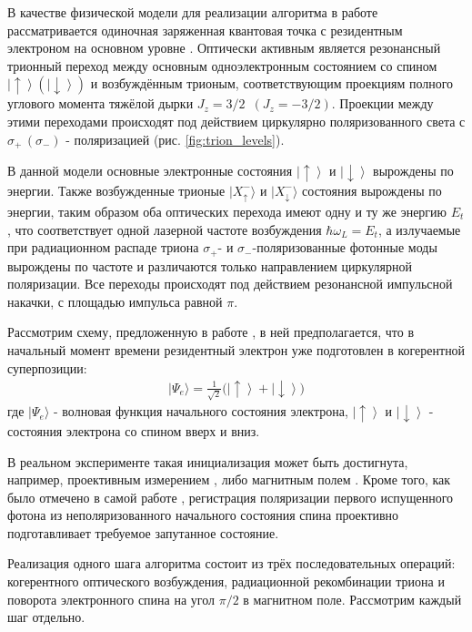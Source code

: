 \documentclass[11pt]{article}    %
\numberwithin{equation}{section}
\begin{document}
В качестве физической модели для реализации алгоритма в работе
\cite{lindner2009} рассматривается одиночная заряженная
квантовая точка с резидентным электроном на основном уровне
\cite{senellart2017}. Оптически активным является резонансный трионный
переход между основным одноэлектронным состоянием со спином
$\left|\uparrow\right\rangle (\left|\downarrow\right\rangle)$
и возбуждённым трионым, соответствующим
проекциям полного углового момента тяжёлой дырки $J_z = 3/2 \, \,\, (J_z = -3/2)$.
Проекции между этими переходами происходят под действием циркулярно поляризованного света
с $\sigma_+ \, (\sigma_-)$ - поляризацией (рис. \ref{fig:trion_levels}).

В данной модели основные электронные состояния
$\left|\uparrow\right\rangle$ и $\left|\downarrow\right\rangle$
вырождены по энергии.
Также возбужденные трионые $|X^-_{\uparrow}\rangle$ и $|X^-_{\downarrow}\rangle$
состояния вырождены по энергии, таким образом оба оптических
перехода имеют одну и ту же энергию $E_t$, что соответствует одной
лазерной частоте возбуждения $\hbar\omega_L = E_t$, а
излучаемые при радиационном распаде триона $\sigma_+$- и
$\sigma_-$-поляризованные фотонные моды вырождены по частоте и
различаются только направлением циркулярной поляризации.
Все переходы происходят под действием резонансной импульсной накачки,
с площадью импульса равной $\pi$.

Рассмотрим схему, предложенную в работе \cite{lindner2009},
в ней предполагается, что в начальный момент времени резидентный
электрон уже подготовлен в когерентной суперпозиции:
\begin{gather}
    |\Psi_e\rangle = \frac{1}{\sqrt{2}}\bigl(\left|\uparrow\right\rangle
    + \left|\downarrow\right\rangle\bigr)
    \label{eq:LR_init}
\end{gather}
где $|\Psi_e\rangle$ - волновая функция начального состояния электрона,
$\left|\uparrow\right\rangle$ и $\left|\downarrow\right\rangle$ - состояния
электрона со спином вверх и вниз.

В реальном эксперименте такая инициализация может быть достигнута,
например,
проективным измерением \cite{atature2006}, либо магнитным полем
\cite{press2008}. Кроме того, как было отмечено в самой работе
\cite{lindner2009}, регистрация поляризации первого
испущенного фотона из неполяризованного начального состояния спина
проективно подготавливает требуемое запутанное состояние.

Реализация одного шага алгоритма состоит из трёх последовательных
операций: когерентного оптического возбуждения, радиационной
рекомбинации триона и поворота электронного спина на угол
$\pi/2$ в магнитном поле. Рассмотрим каждый шаг отдельно.
\end{document}
